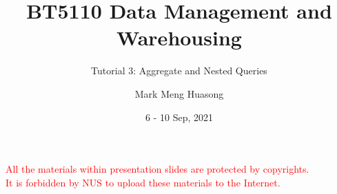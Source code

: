 \title{BT5110 Data Management and Warehousing}

\subtitle{Tutorial 3: Aggregate and Nested Queries}

\author{Mark Meng Huasong}



\date{6 - 10 Sep, 2021}

\begin{frame}
	\titlepage
	\begin{tcolorbox}
		\begin{center}
			{\scriptsize \textcolor{red}{All the materials within presentation slides are protected by copyrights.\\
					It is forbidden by NUS to upload these materials to the Internet.}}
		\end{center}
	\end{tcolorbox}
\end{frame}


